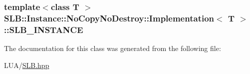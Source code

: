 \subsubsection[{\texorpdfstring{S\+L\+B\+\_\+\+I\+N\+S\+T\+A\+N\+CE}{SLB_INSTANCE}}]{\setlength{\rightskip}{0pt plus 5cm}template$<$class T $>$ {\bf S\+L\+B\+::\+Instance\+::\+No\+Copy\+No\+Destroy\+::\+Implementation}$<$ T $>$\+::S\+L\+B\+\_\+\+I\+N\+S\+T\+A\+N\+CE\hspace{0.3cm}{\ttfamily [protected]}}\hypertarget{classSLB_1_1Instance_1_1NoCopyNoDestroy_1_1Implementation_a02d4c3ff6cfbe5a6bab26456e5492fdd}{}\label{classSLB_1_1Instance_1_1NoCopyNoDestroy_1_1Implementation_a02d4c3ff6cfbe5a6bab26456e5492fdd}


The documentation for this class was generated from the following file\+:\begin{DoxyCompactItemize}
\item 
L\+U\+A/\hyperlink{SLB_8hpp}{S\+L\+B.\+hpp}\end{DoxyCompactItemize}
